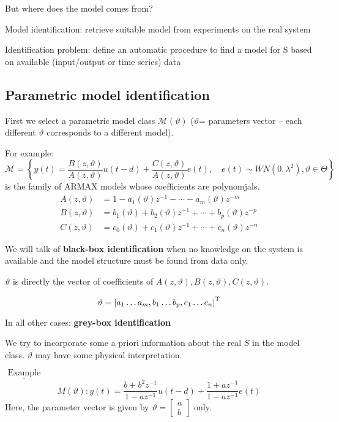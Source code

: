But where does the model comes from?

Model identification: retrieve suitable model from experiments on 
the real system 


Identification problem: define an automatic procedure to find a 
model for S based on available (input/output or time series) data 


\subsection{Parametric model identification}
First we select a parametric model class $\mathcal{M}(\vartheta)$
($\vartheta$= parameters vector – each different $\vartheta$ corresponds to a 
different model).

For example:
$$
\mathcal{M}=\left\{y(t)=\frac{B(z, \vartheta)}{A(z, \vartheta)} u(t-d)+\frac{C(z, \vartheta)}{A(z, \vartheta)} e(t), \quad e(t) \sim WN\left(0, \lambda^{2}\right), \vartheta\in\Theta\right\}
$$
is the family of ARMAX models whose coefficients are polynomjals.
\begin{align*}
	A(z, \vartheta)&=1-a_{1}(\vartheta) z^{-1}-\cdots-a_{m}(\vartheta) z^{-m} \\
	B(z, \vartheta)&=b_{1}(\vartheta)+b_{2}(\vartheta) z^{-1}+\cdots+b_{p}(\vartheta) z^{-p}\\
	C(z, \vartheta)&=c_0(\vartheta)+c_{1}(\vartheta) z^{-1}+\cdots+c_{n}(\vartheta) z^{-n}
\end{align*}

We will talk of \textbf{black-box identification} when no knowledge 
on the system is available and the model structure must be found from 
data only.

$\vartheta$ is directly the vector of coefficients of $A(z, \vartheta),B(z, \vartheta),C(z, \vartheta)$.

$$
	\vartheta=\left[a_{1}  \ldots a_{m},  b_{1} \ldots b_{p} ,c_{1} \ldots c_{n}\right]^{\mathrm{T}}
$$

In all other cases: \textbf{grey-box identification}

We try to incorporate some a priori information about the real $S$ in the model class. $\vartheta$ may have some physical interpretation.

$\underline{\text { Example }}$
$$
M(\vartheta): y(t)=\frac{b+b^{2} z^{-1}}{1-a z^{-1}} u(t-d)+\frac{1+a z^{-1}}{1-a z^{-1}} e(t)
$$
Here, the parameter vector is given by $\vartheta=\left[\begin{array}{l}a \\ b\end{array}\right]$ only.


